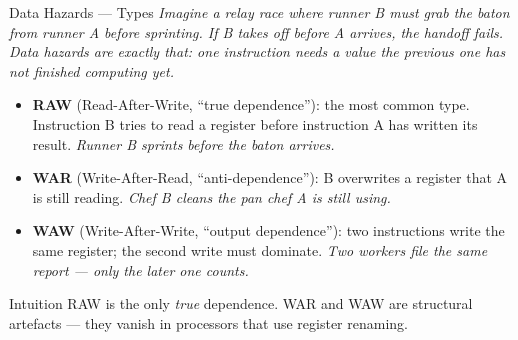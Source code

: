 \documentclass{beamer}
\begin{document}
\begin{frame}{Data Hazards --- Types}
  \textit{Imagine a relay race where runner B must grab the baton from runner A
  before sprinting. If B takes off before A arrives, the handoff fails.
  Data hazards are exactly that: one instruction needs a value the previous
  one has not finished computing yet.}

  \smallskip
  \begin{itemize}
    \item \textbf{RAW} (Read-After-Write, ``true dependence''): the most common
          type. Instruction B tries to read a register before instruction A has
          written its result. \textit{Runner B sprints before the baton arrives.}
    \item \textbf{WAR} (Write-After-Read, ``anti-dependence''): B overwrites a
          register that A is still reading. \textit{Chef B cleans the pan chef A
          is still using.}
    \item \textbf{WAW} (Write-After-Write, ``output dependence''): two
          instructions write the same register; the second write must dominate.
          \textit{Two workers file the same report --- only the later one counts.}
  \end{itemize}

  \begin{block}{Intuition}
    \small RAW is the only \emph{true} dependence. WAR and WAW are structural
    artefacts --- they vanish in processors that use register renaming.
  \end{block}
\end{frame}
\end{document}
